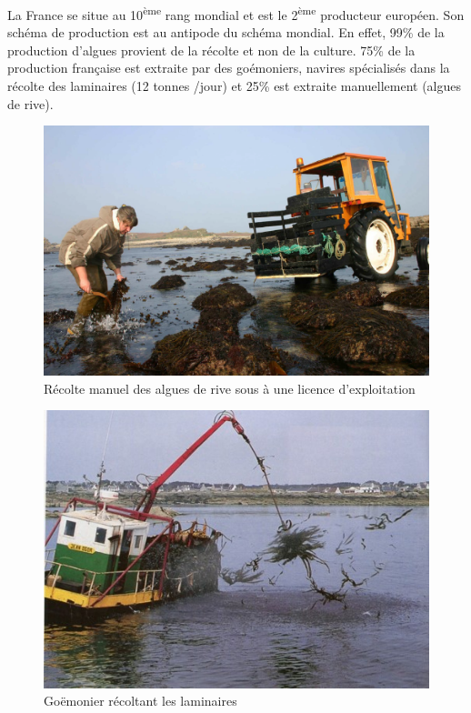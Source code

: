\documentclass[
]{book}
\begin{document}
La France se situe au 10\textsuperscript{ème} rang mondial et est le 2\textsuperscript{ème} producteur européen. Son schéma de production est au antipode du schéma mondial. En effet, 99\% de la production d'algues provient de la récolte et non de la culture. 75\% de la production française est extraite par des goémoniers, navires spécialisés dans la récolte des laminaires (12 tonnes /jour) et 25\% est extraite manuellement (algues de rive).

\begin{figure}

{\centering \includegraphics{images/recoltealguemain} 

}

\caption{Récolte manuel des algues de rive sous à une licence d'exploitation}\label{fig:recoltealguemain}
\end{figure}

\begin{figure}

{\centering \includegraphics{images/goemonier} 

}

\caption{Goëmonier récoltant les laminaires}\label{fig:goemonier}
\end{figure}
\end{document}

